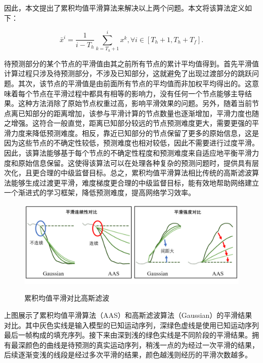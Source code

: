 因此，本文提出了累积均值平滑算法来解决以上两个问题。本文将该算法定义如下：

\begin{equation}
    \bar{x}^i = \frac{1}{i-T_h}\sum_{k=T_h+1}^{i}x^k, \forall i\in[T_h+1, T_h+T_f].
    \label{equation:AAS}
\end{equation}

待预测部分的某个节点的平滑值由其之前所有节点的累计平均值得到。首先平滑值计算过程只涉及待预测部分，不涉及已知部分，这就避免了出现过渡部分的跳跃问题。其次，该节点的平滑值是由前面所有节点的平均值而非加权平均得出的。这意味着每个节点在平滑过程中都具有相等的影响力，没有任何一个节点能够主导结果。这种方法消除了原始节点权重过高，影响平滑效果的问题。另外，随着当前节点离已知部分的距离增加，该参与平滑计算的节点数量也逐渐增加，平滑力度也随之增强。这符合一般直觉，距离已知部分较远的节点预测难度更大，需要更强的平滑力度来降低预测难度。相反，靠近已知部分的节点保留了更多的原始信息，这是因为这些节点的不确定性较低，预测难度也相对较低，因此不需要进行过度平滑。因此，该算法能够基于每个节点的不确定性程度和预测难度来自适应地平衡平滑力度和原始信息保留。这使得该算法可以在处理各种复杂的预测问题时，提供具有层次化，且更合理的中级监督目标。总之，累积均值平滑算法相比传统的高斯滤波算法能够生成过渡更平滑，难度梯度更合理的中级监督目标，能有效地帮助网络建立一个渐进式的学习框架，降低预测难度，提高网络学习效率。

\begin{figure}[ht]
    \centering
    \includegraphics[width=1\textwidth]{FigMa/AAS.png}\\
    \vspace{-0.3cm}
    \caption{累积均值平滑对比高斯滤波}
    \label{fig:AAS}
\end{figure}
上图展示了累积均值平滑算法（AAS）和高斯滤波算法（Gaussian）的平滑结果对比。其中灰色实线是输入模型的已知运动序列，深绿色虚线是使用已知运动序列最后一帧构成的填充序列。接下来由深到浅的绿色实线是不同阶段的平滑结果。拥有最深颜色的曲线是待预测的真实运动序列，稍浅一点的为经过一次平滑的结果，后续逐渐变浅的线段是经过多次平滑的结果，颜色越浅则经历的平滑次数越多。

